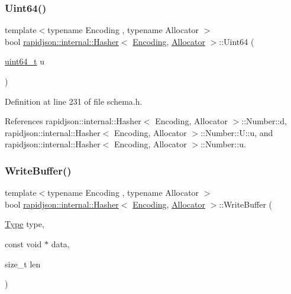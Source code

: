\subsubsection{\texorpdfstring{Uint64()}{Uint64()}}
{\footnotesize\ttfamily template$<$typename Encoding , typename Allocator $>$ \\
bool \mbox{\hyperlink{classrapidjson_1_1internal_1_1_hasher}{rapidjson\+::internal\+::\+Hasher}}$<$ \mbox{\hyperlink{classrapidjson_1_1_encoding}{Encoding}}, \mbox{\hyperlink{classrapidjson_1_1_allocator}{Allocator}} $>$\+::Uint64 (\begin{DoxyParamCaption}\item[{\mbox{\hyperlink{stdint_8h_aec6fcb673ff035718c238c8c9d544c47}{uint64\+\_\+t}}}]{u }\end{DoxyParamCaption})}



Definition at line 231 of file schema.\+h.


\begin{DoxyCode}{0}

\end{DoxyCode}


References rapidjson\+::internal\+::\+Hasher$<$ Encoding, Allocator $>$\+::\+Number\+::d, rapidjson\+::internal\+::\+Hasher$<$ Encoding, Allocator $>$\+::\+Number\+::\+U\+::u, and rapidjson\+::internal\+::\+Hasher$<$ Encoding, Allocator $>$\+::\+Number\+::u.

\mbox{\label{classrapidjson_1_1internal_1_1_hasher_a2a1680589f6410879ec277736181209b}} 
\subsubsection{\texorpdfstring{WriteBuffer()}{WriteBuffer()}}
{\footnotesize\ttfamily template$<$typename Encoding , typename Allocator $>$ \\
bool \mbox{\hyperlink{classrapidjson_1_1internal_1_1_hasher}{rapidjson\+::internal\+::\+Hasher}}$<$ \mbox{\hyperlink{classrapidjson_1_1_encoding}{Encoding}}, \mbox{\hyperlink{classrapidjson_1_1_allocator}{Allocator}} $>$\+::Write\+Buffer (\begin{DoxyParamCaption}\item[{\mbox{\hyperlink{namespacerapidjson_ae79a4751c1c460ff0de5ecc07874f3e4}{Type}}}]{type,  }\item[{const void $\ast$}]{data,  }\item[{size\+\_\+t}]{len }\end{DoxyParamCaption})\hspace{0.3cm}{\ttfamily [private]}}




